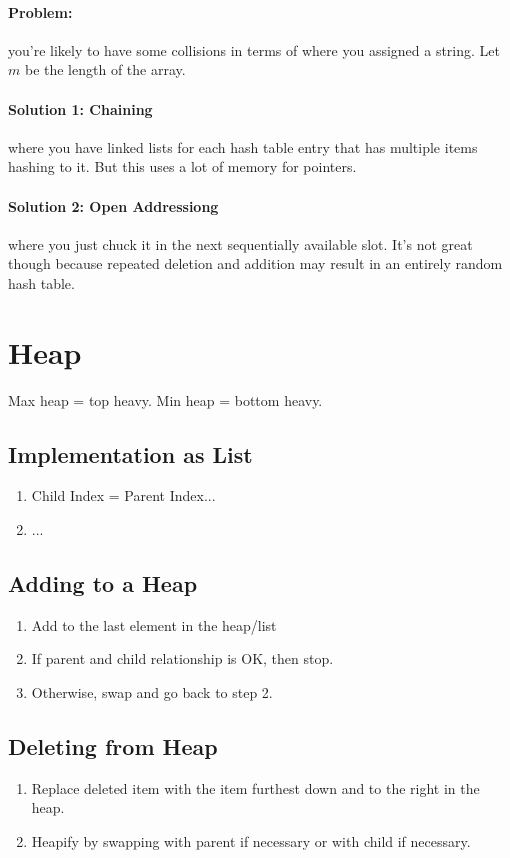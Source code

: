 \documentclass[a4paper,12pt]{report}
\begin{document}
\paragraph{Problem: } you're likely to have some collisions in terms of where you assigned a string. Let $m$ be the length of the array. 

\paragraph{Solution 1: Chaining } where you have linked lists for each hash table entry that has multiple items hashing to it. But this uses a lot of memory for pointers.

\paragraph{Solution 2: Open Addressiong } where you just chuck it in the next sequentially available slot. It's not great though because repeated deletion and addition may result in an entirely random hash table.  

\section{Heap}
Max heap = top heavy. Min heap = bottom heavy.
\subsection{Implementation as List}
\begin{enumerate}
\item Child Index = Parent Index...
\item ...
\end{enumerate}

\subsection{Adding to a Heap}
\begin{enumerate}
\item Add to the last element in the heap/list
\item If parent and child relationship is OK, then stop.
\item Otherwise, swap and go back to step 2.
\end{enumerate}

\subsection{Deleting from Heap}
\begin{enumerate}
\item Replace deleted item with the item furthest down and to the right in the heap.
\item Heapify by swapping with parent if necessary or with child if necessary.
\end{enumerate}
\end{document}
